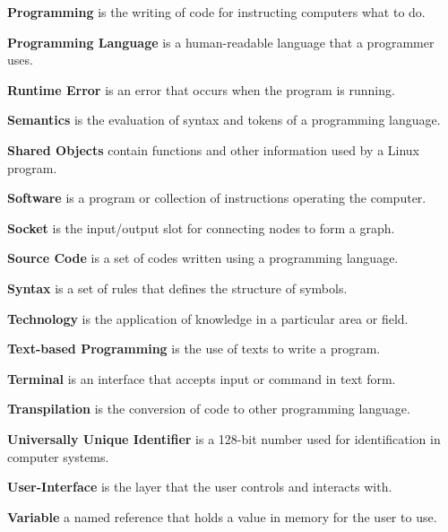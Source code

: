 \parx
\textbf{Programming} is the writing of code for instructing computers what to do.

\parx
\textbf{Programming Language} is a human-readable language that a programmer uses.

\parx
\textbf{Runtime Error} is an error that occurs when the program is running.

\parx
\textbf{Semantics} is the evaluation of syntax and tokens of a programming language.

\parx
\textbf{Shared Objects} contain functions and other information used by a Linux program.

\parx
\textbf{Software} is a program or collection of instructions operating the computer.

\parx
\textbf{Socket} is the input/output slot for connecting nodes to form a graph.

\parx
\textbf{Source Code} is a set of codes written using a programming language.

\parx
\textbf{Syntax} is a set of rules that defines the structure of symbols.

\parx
\textbf{Technology} is the application of knowledge in a particular area or field.

\parx
\textbf{Text-based Programming} is the use of texts to write a program.

\parx
\textbf{Terminal} is an interface that accepts input or command in text form.

\parx
\textbf{Transpilation} is the conversion of code to other programming language.

\parx
\textbf{Universally Unique Identifier} is a 128-bit number used for identification in computer systems.

\parx
\textbf{User-Interface} is the layer that the user controls and interacts with.

\parx
\textbf{Variable} a named reference that holds a value in memory for the user to use.
